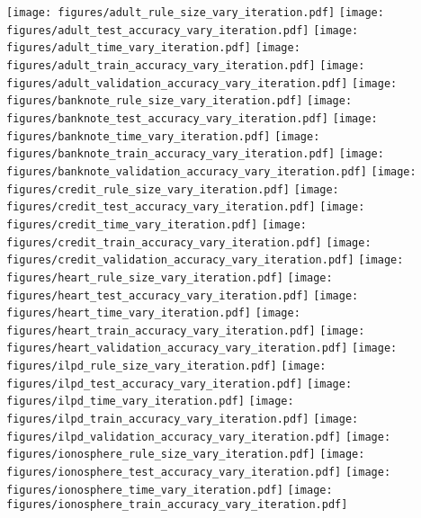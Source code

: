 \begin{figure*}
	\texttt{[image: figures/adult\_rule\_size\_vary\_iteration.pdf]}
	\texttt{[image: figures/adult\_test\_accuracy\_vary\_iteration.pdf]}
	\texttt{[image: figures/adult\_time\_vary\_iteration.pdf]}
	\texttt{[image: figures/adult\_train\_accuracy\_vary\_iteration.pdf]}
	\texttt{[image: figures/adult\_validation\_accuracy\_vary\_iteration.pdf]}
	\texttt{[image: figures/banknote\_rule\_size\_vary\_iteration.pdf]}
	\texttt{[image: figures/banknote\_test\_accuracy\_vary\_iteration.pdf]}
	\texttt{[image: figures/banknote\_time\_vary\_iteration.pdf]}
	\texttt{[image: figures/banknote\_train\_accuracy\_vary\_iteration.pdf]}
	\texttt{[image: figures/banknote\_validation\_accuracy\_vary\_iteration.pdf]}
	\texttt{[image: figures/credit\_rule\_size\_vary\_iteration.pdf]}
	\texttt{[image: figures/credit\_test\_accuracy\_vary\_iteration.pdf]}
	\texttt{[image: figures/credit\_time\_vary\_iteration.pdf]}
	\texttt{[image: figures/credit\_train\_accuracy\_vary\_iteration.pdf]}
	\texttt{[image: figures/credit\_validation\_accuracy\_vary\_iteration.pdf]}
	\texttt{[image: figures/heart\_rule\_size\_vary\_iteration.pdf]}
	\texttt{[image: figures/heart\_test\_accuracy\_vary\_iteration.pdf]}
	\texttt{[image: figures/heart\_time\_vary\_iteration.pdf]}
	\texttt{[image: figures/heart\_train\_accuracy\_vary\_iteration.pdf]}
	\texttt{[image: figures/heart\_validation\_accuracy\_vary\_iteration.pdf]}
	\texttt{[image: figures/ilpd\_rule\_size\_vary\_iteration.pdf]}
	\texttt{[image: figures/ilpd\_test\_accuracy\_vary\_iteration.pdf]}
	\texttt{[image: figures/ilpd\_time\_vary\_iteration.pdf]}
	\texttt{[image: figures/ilpd\_train\_accuracy\_vary\_iteration.pdf]}
	\texttt{[image: figures/ilpd\_validation\_accuracy\_vary\_iteration.pdf]}
	\texttt{[image: figures/ionosphere\_rule\_size\_vary\_iteration.pdf]}
	\texttt{[image: figures/ionosphere\_test\_accuracy\_vary\_iteration.pdf]}
	\texttt{[image: figures/ionosphere\_time\_vary\_iteration.pdf]}
	\texttt{[image: figures/ionosphere\_train\_accuracy\_vary\_iteration.pdf]}

\end{figure*}
